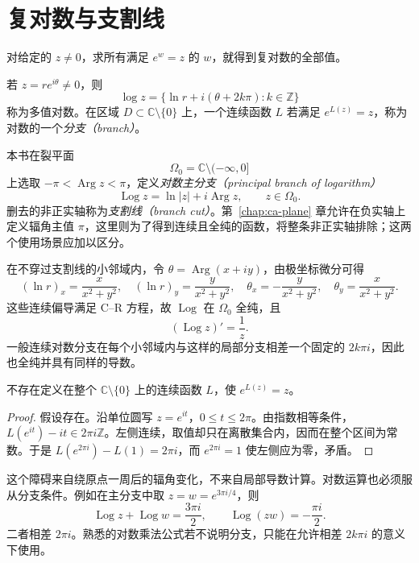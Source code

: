 \section{复对数与支割线}

对给定的 $z\ne0$，求所有满足 $e^w=z$ 的 $w$，就得到复对数的全部值。

\begin{definition}[多值对数与对数分支]
若 $z=re^{i\theta}\ne0$，则
\[
 \log z=\{\ln r+i(\theta+2k\pi):k\in\mathbb Z\}
\]
称为多值对数。在区域 $D\subset\mathbb C\setminus\{0\}$ 上，一个连续函数 $L$ 若满足 $e^{L(z)}=z$，称为对数的一个\emph{分支（branch）}。
\end{definition}

本书在裂平面
\[
 \Omega_0=\mathbb C\setminus(-\infty,0]
\]
上选取 $-\pi<\operatorname{Arg}z<\pi$，定义\emph{对数主分支（principal branch of logarithm）}
\begin{equation}
 \operatorname{Log}z=\ln|z|+i\operatorname{Arg}z,
 \qquad z\in\Omega_0.
 \label{eq:ca-log}
\end{equation}
删去的非正实轴称为\emph{支割线（branch cut）}。第~\ref{chap:ca-plane} 章允许在负实轴上定义辐角主值 $\pi$，这里则为了得到连续且全纯的函数，将整条非正实轴排除；这两个使用场景应加以区分。

在不穿过支割线的小邻域内，令 $\theta=\operatorname{Arg}(x+iy)$，由极坐标微分可得
\[
 (\ln r)_x=\frac{x}{x^2+y^2},\quad
 (\ln r)_y=\frac{y}{x^2+y^2},\quad
 \theta_x=-\frac{y}{x^2+y^2},\quad
 \theta_y=\frac{x}{x^2+y^2}.
\]
这些连续偏导满足 C--R 方程，故 $\operatorname{Log}$ 在 $\Omega_0$ 全纯，且
\begin{equation}
 (\operatorname{Log}z)'=\frac1z.
 \label{eq:ca-log-derivative}
\end{equation}
一般连续对数分支在每个小邻域内与这样的局部分支相差一个固定的 $2k\pi i$，因此也全纯并具有同样的导数。

\begin{proposition}[去心平面上不存在连续对数分支]
\label{prop:ca-no-global-log}
不存在定义在整个 $\mathbb C\setminus\{0\}$ 上的连续函数 $L$，使 $e^{L(z)}=z$。
\end{proposition}
\begin{proof}
假设存在。沿单位圆写 $z=e^{it}$，$0\le t\le2\pi$。由指数相等条件，$L(e^{it})-it\in2\pi i\mathbb Z$。左侧连续，取值却只在离散集合内，因而在整个区间为常数。于是 $L(e^{2\pi i})-L(1)=2\pi i$，而 $e^{2\pi i}=1$ 使左侧应为零，矛盾。
\end{proof}

这个障碍来自绕原点一周后的辐角变化，不来自局部导数计算。对数运算也必须服从分支条件。例如在主分支中取 $z=w=e^{3\pi i/4}$，则
\[
 \operatorname{Log}z+\operatorname{Log}w=\frac{3\pi i}{2},\qquad
 \operatorname{Log}(zw)=-\frac{\pi i}{2}.
\]
二者相差 $2\pi i$。熟悉的对数乘法公式若不说明分支，只能在允许相差 $2k\pi i$ 的意义下使用。

